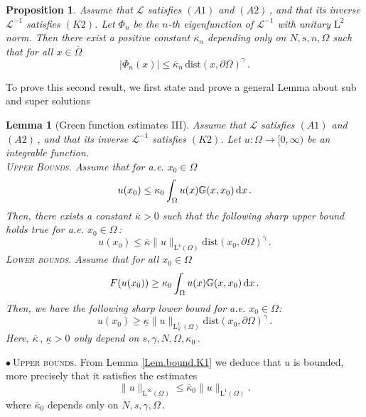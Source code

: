 \documentclass[11pt]{article}
\newtheorem{lem}[thm]{Lemma}
\newtheorem{prop}[thm]{Proposition}
\numberwithin{equation}{section}
\newcommand{\dx}{\,{\rm d}x}
\def\LL{\mathrm{L}} %
\newcommand{\A}{\mathcal{L}}
\newcommand{\AI}{\mathcal{L}^{-1}}
\newcommand{\n}{F}
\newcommand{\p}{{\delta^\gamma}} %
\newcommand{\ka}{\overline{\kappa}}
\newcommand{\kb}{\underline{\kappa}}
\newcommand{\K}{{\mathbb G}}
\def\dist{\mathrm{dist}} %
\begin{document}
\begin{prop}\label{cor.eigenfunctions}
Assume that $\A$ satisfies  $(A1)$ and $(A2)$\,, and that its inverse $\AI$ satisfies $(K2)$.
Let $\Phi_n$ be the $n$-th eigenfunction of $\AI$ with unitary $\LL^2$ norm.
Then there exist a positive constant $\ka_n$ depending only on $N,s,n,\Omega$ such that for all $x\in \overline{\Omega}$
\begin{equation}\label{eigenfunctions.bounds}
|\Phi_n(x)| \le \ka_n\, \dist(x,\partial\Omega)^\gamma\,.
\end{equation}
\end{prop}

To prove this second result, we first state and prove
a general Lemma about sub and super solutions

\begin{lem}[Green function estimates III]\label{Lem.Green.lineare}
Assume that $\A$ satisfies  $(A1)$ and $(A2)$\,, and that its inverse $\AI$ satisfies $(K2)$. Let $u:\Omega \to [0,\infty)$ be an integrable function. \\
\noindent\textsc{Upper Bounds. }Assume that for a.e. $x_0\in\Omega$
\begin{equation}\label{Lem.Green.lineare.hyp-upper}
 u(x_0) \le \kappa_0\int_{\Omega} u(x)\K(x,x_0)\dx\,.
\end{equation}
Then, there exists a constant $\ka>0$ such that the following sharp upper bound holds true for a.e. $x_0\in \Omega$\,:
\begin{equation}\label{Lem.Green.lineare.upper}
u(x_0) \le \ka \|u\|_{\LL^1(\Omega)}\dist(x_0,\partial\Omega)^\gamma\,.
\end{equation}
\textsc{Lower bounds. }Assume that for all $x_0\in\Omega$
\begin{equation}\label{Lem.Green.lineare.hyp-lower}
\n(u(x_0))\ge \kappa_0\int_{\Omega} u(x)\K(x,x_0)\dx\,.
\end{equation}
Then, we have the following sharp lower bound for a.e. $x_0\in \Omega$:
\begin{equation}\label{Lem.Green.lineare.lower}
u(x_0) \ge \kb\|u\|_{\LL^1_{\p}(\Omega)}\dist(x_0,\partial\Omega)^\gamma\,.
\end{equation}
Here, $\ka \,,\,\kb >0$ only depend on $s,\gamma,  N,\Omega,\kappa_0$\,.
\end{lem}

\noindent$\bullet~$\textsc{Upper bounds. }From Lemma \ref{Lem.bound.K1} we deduce that $u$ is bounded, more precisely that it satisfies the estimates
\[
\|u\|_{\LL^\infty(\Omega)}\le \ka_0 \|u\|_{\LL^1(\Omega)}.
\]
where $\ka_0$ depends only on $N,s,\gamma,\Omega$\,.
\end{document}
